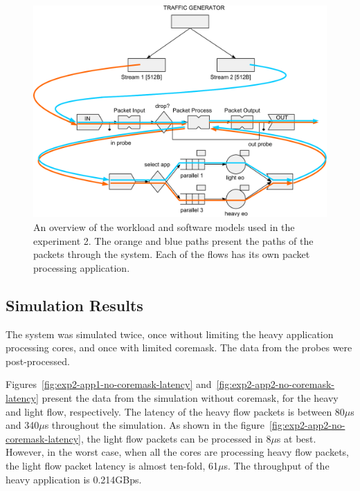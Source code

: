 \begin{figure}[]
  \begin{center}
    \includegraphics[width=\textwidth]{images/pse-models/exp2-software.pdf}
    \caption{An overview of the workload and software  models used in the experiment 2. The orange and blue paths present the paths of the packets through the system. Each of the flows has its own packet processing application.}
    \label{fig:exp2-software}
  \end{center}
\end{figure}

\subsection{Simulation Results}
\label{sec:exp2-simulation-results}

The system was simulated twice, once without limiting the heavy application processing cores, and once with limited coremask. The data from the probes were post-processed.

Figures~\ref{fig:exp2-app1-no-coremask-latency} and~\ref{fig:exp2-app2-no-coremask-latency} present the data from the simulation without coremask, for the heavy and light flow, respectively. The latency of the heavy flow packets is between 80$\mu$s and 340$\mu$s throughout the simulation. As shown in the figure~\ref{fig:exp2-app2-no-coremask-latency}, the light flow packets can be processed in 8$\mu$s at best. However, in the worst case, when all the cores are processing heavy flow packets, the light flow packet latency is almost ten-fold, 61$\mu$s. The throughput of the heavy application is 0.214GBps.

